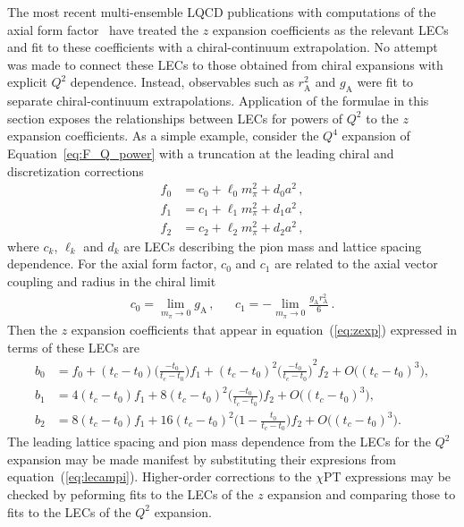\documentclass{ar-1col}
\begin{document}
The most recent multi-ensemble LQCD publications with computations
 of the axial form factor~\cite{Park:2021ypf,RQCD:2019jai}
 have treated the $z$ expansion coefficients as the relevant LECs
 and fit to these coefficients with a chiral-continuum extrapolation.
No attempt was made to connect these LECs to those obtained
 from chiral expansions with explicit $Q^2$ dependence.
Instead, observables such as $r_{\mathrm{A}}^2$ and $g_{\mathrm{A}}$
 were fit to separate chiral-continuum extrapolations.
Application of the formulae in this section exposes the relationships
 between LECs for powers of $Q^2$ to the $z$ expansion coefficients.
 As a simple example, consider the $Q^4$ expansion of Equation~\eqref{eq:F_Q_power} with
 a truncation at the leading chiral and discretization corrections
\begin{align}
f_0 &= c_0 + \ell_0 m_\pi^2 + d_0 a^2\, ,
\nonumber\\
f_1 &= c_1 + \ell_1 m_\pi^2 + d_1 a^2\, ,
\nonumber\\
f_2 &= c_2 + \ell_2 m_\pi^2 + d_2 a^2\, ,
\label{eq:lecampi}
\end{align}
where $c_k$, $\ell_k$ and $d_k$ are LECs describing the pion mass and lattice spacing dependence.
For the axial form factor, $c_0$ and $c_1$ are related to the axial vector coupling and radius in the chiral limit
\begin{align}
&c_0 = \lim_{m_\pi\rightarrow0} g_{\mathrm{A}}\, ,&
&c_1 = -\lim_{m_\pi\rightarrow0} \frac{g_{\mathrm{A}} r_{\mathrm{A}}^2}{6}\, .&
\end{align}
Then the $z$ expansion coefficients that appear in equation~(\ref{eq:zexp})
 expressed in terms of these LECs are
\newcommand{\tctza}{\ensuremath{(t_c-t_0)}}
\newcommand{\tctzb}{\ensuremath{\Big(\frac{-t_0}{t_c-t_0}\Big)}}
\begin{align}\label{eq:z_coeff_xpt}
b_0 &= f_0 +\tctza \tctzb f_1 +\tctza^2 \tctzb^2 f_2 +O\big(\tctza^3\big),
\nonumber\\
b_1 &= 4 \tctza f_1 +8 \tctza^2 \tctzb f_2 +O\big(\tctza^3\big),
\nonumber\\
b_2 &= 8 \tctza f_1 +16 \tctza^2 \Big(1 -\frac{t_0}{t_c-t_0}\Big) f_2 +O\big(\tctza^3\big).
\end{align}
The leading lattice spacing and pion mass dependence from
 the LECs for the $Q^2$ expansion may be made manifest
 by substituting their expresions from equation~(\ref{eq:lecampi}).
Higher-order corrections to the $\chi$PT expressions may be checked
 by peforming fits to the LECs of the $z$ expansion and comparing those
 to fits to the LECs of the $Q^2$ expansion.
\end{document}
